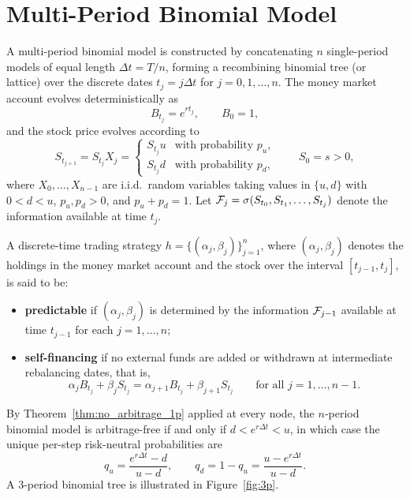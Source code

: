 \section{Multi-Period Binomial Model}

A multi-period binomial model is constructed by concatenating $n$ single-period models of equal length $\Delta t = T / n$, forming a recombining binomial tree (or lattice) over the discrete dates $t_j = j \Delta t$ for $j = 0, 1, \dots, n$. The money market account evolves deterministically as
\[
    B_{t_j} = e^{r t_j}, \qquad B_0 = 1,
\]
and the stock price evolves according to
\[
    S_{t_{j+1}} = S_{t_j} X_j =
    \begin{cases}
        S_{t_j} u & \text{with probability } p_u, \\
        S_{t_j} d & \text{with probability } p_d,
    \end{cases}
    \qquad S_0 = s > 0,
\]
where $X_0, \dots, X_{n-1}$ are i.i.d.\ random variables taking values in $\{u, d\}$ with $0 < d < u$, $p_u, p_d > 0$, and $p_u + p_d = 1$. Let $\mathcal{F}_j = \sigma(S_{t_0}, S_{t_1}, \dots, S_{t_j})$ denote the information available at time $t_j$.

\begin{definition}
\label{def:self_financing_predictable}
A discrete-time trading strategy $h = \{(\alpha_j, \beta_j)\}_{j=1}^{n}$, where $(\alpha_j, \beta_j)$ denotes the holdings in the money market account and the stock over the interval $[t_{j-1}, t_j]$, is said to be:
\begin{itemize}
    \item \textbf{predictable} if $(\alpha_j, \beta_j)$ is determined by the information $\mathcal{F}_{j-1}$ available at time $t_{j-1}$ for each $j = 1, \dots, n$;
    \item \textbf{self-financing} if no external funds are added or withdrawn at intermediate rebalancing dates, that is,
    \[
        \alpha_j B_{t_j} + \beta_j S_{t_j} = \alpha_{j+1} B_{t_j} + \beta_{j+1} S_{t_j} \qquad \text{for all } j = 1, \dots, n - 1.
    \]
\end{itemize}
\end{definition}

By Theorem~\ref{thm:no_arbitrage_1p} applied at every node, the $n$-period binomial model is arbitrage-free if and only if $d < e^{r \Delta t} < u$, in which case the unique per-step risk-neutral probabilities are
\[
    q_u = \frac{e^{r \Delta t} - d}{u - d}, \qquad q_d = 1 - q_u = \frac{u - e^{r \Delta t}}{u - d}.
\]
A 3-period binomial tree is illustrated in Figure~\ref{fig:3p}.

